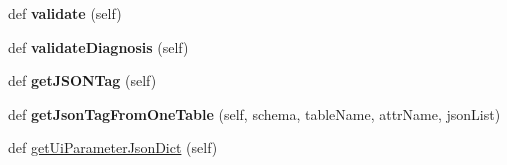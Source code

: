 \begin{DoxyCompactItemize}
def {\bfseries validate} (self)
\item 
\mbox{\label{class_dsg_tools_1_1_custom_widgets_1_1_custom_db_management_widgets_1_1alter_default_widget_1_1_alter_default_widget_a86eb8a4b1acebf3866ec09a7bfe531e6}} 
def {\bfseries validate\+Diagnosis} (self)
\item 
\mbox{\label{class_dsg_tools_1_1_custom_widgets_1_1_custom_db_management_widgets_1_1alter_default_widget_1_1_alter_default_widget_aef00d9b3f995a16f7430f856c12aa4b1}} 
def {\bfseries get\+J\+S\+O\+N\+Tag} (self)
\item 
\mbox{\label{class_dsg_tools_1_1_custom_widgets_1_1_custom_db_management_widgets_1_1alter_default_widget_1_1_alter_default_widget_a1b013fd5126a1f24bb47002661157511}} 
def {\bfseries get\+Json\+Tag\+From\+One\+Table} (self, schema, table\+Name, attr\+Name, json\+List)
\item 
def \mbox{\hyperlink{class_dsg_tools_1_1_custom_widgets_1_1_custom_db_management_widgets_1_1alter_default_widget_1_1_alter_default_widget_aaa5f6dec82d55dd9df58afd969081705}{get\+Ui\+Parameter\+Json\+Dict}} (self)
\end{DoxyCompactItemize}
